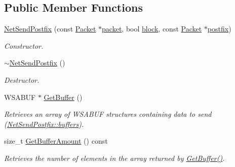 \subsection*{Public Member Functions}
\begin{DoxyCompactItemize}
\item 
\hyperlink{class_net_send_postfix_aa94a0a4cae94625957301924b054d34a}{NetSendPostfix} (const \hyperlink{class_packet}{Packet} $\ast$\hyperlink{class_net_send_postfix_a2b2681bf0bf3dce55574c1b6f2414c5e}{packet}, bool \hyperlink{class_net_send_afd9338a4ab3648178d0b5c816a0852d1}{block}, const \hyperlink{class_packet}{Packet} $\ast$\hyperlink{class_net_send_postfix_a7ac54a6f1a83c952ace599d72ca9f4ca}{postfix})
\begin{DoxyCompactList}\small\item\em Constructor. \item\end{DoxyCompactList}\item 
\hypertarget{class_net_send_postfix_a2e017bccfd025ebd9f3972994d0306fb}{
\hyperlink{class_net_send_postfix_a2e017bccfd025ebd9f3972994d0306fb}{$\sim$NetSendPostfix} ()}
\label{class_net_send_postfix_a2e017bccfd025ebd9f3972994d0306fb}

\begin{DoxyCompactList}\small\item\em Destructor. \item\end{DoxyCompactList}\item 
WSABUF $\ast$ \hyperlink{class_net_send_postfix_a0421a520c5a00497cdc2baf4bd1c019d}{GetBuffer} ()
\begin{DoxyCompactList}\small\item\em Retrieves an array of WSABUF structures containing data to send (\hyperlink{class_net_send_postfix_a36aafafb7f8795742b03165f4398bf7d}{NetSendPostfix::buffers}). \item\end{DoxyCompactList}\item 
size\_\-t \hyperlink{class_net_send_postfix_a4bc21c00e63893fb3c643cb6ee1a9f11}{GetBufferAmount} () const 
\begin{DoxyCompactList}\small\item\em Retrieves the number of elements in the array returned by \hyperlink{class_net_send_postfix_a0421a520c5a00497cdc2baf4bd1c019d}{GetBuffer()}. \item\end{DoxyCompactList}\end{DoxyCompactItemize}
